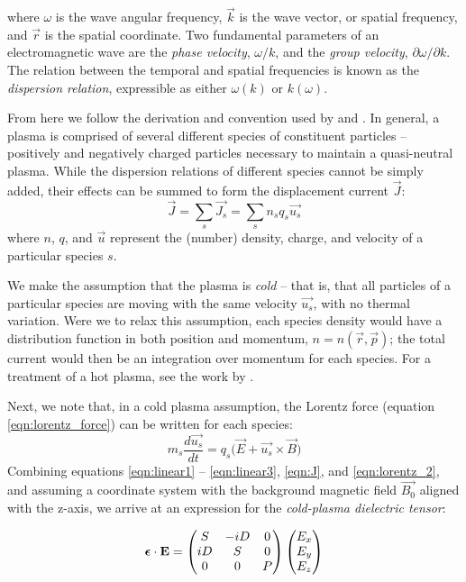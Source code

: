 where $\omega$ is the wave angular frequency, $\vec{k}$ is the wave vector, or spatial frequency, and $\vec{r}$ is the spatial coordinate. Two fundamental parameters of an electromagnetic wave are the \emph{phase velocity}, $\omega/k$, and the \emph{group velocity}, $\partial\omega/\partial k$. The relation between the temporal and spatial frequencies is known as the \emph{dispersion relation}, expressible as either $\omega(k)$ or $k(\omega)$. 

From here we follow the derivation and convention used by \cite{Stix1992} and \cite{Bittencourt2004}. In general, a plasma is comprised of several different species of constituent particles -- positively and negatively charged particles necessary to maintain a quasi-neutral plasma. While the dispersion relations of different species cannot be simply added, their effects can be summed to form the displacement current $\vec{J}$:
\begin{equation}
\vec{J} = \sum_s\vec{J_s} = \sum_s n_s q_s \vec{u_s}
\label{eqn:J}
\end{equation}
where $n$, $q$, and $\vec{u}$ represent the (number) density, charge, and velocity of a particular species $s$. 

We make the assumption that the plasma is \emph{cold} -- that is, that all particles of a particular species are moving with the same velocity $\vec{u_s}$, with no thermal variation.  Were we to relax this assumption, each species density would have a distribution function in both position and momentum, $n=n(\vec{r},\vec{p})$; the total current would then be an integration over momentum for each species. For a treatment of a hot plasma, see the work by \cite{Sazhin1993}.

Next, we note that, in a cold plasma assumption, the Lorentz force (equation \ref{eqn:lorentz_force}) can be written for each species:
\begin{equation}
m_s\frac{d\vec{u_s}}{dt} = q_s\big(\vec{E} + \vec{u_s}\times\vec{B}\big) 
\label{eqn:lorentz_2}
\end{equation}
Combining equations \ref{eqn:linear1} -- \ref{eqn:linear3}, \ref{eqn:J}, and \ref{eqn:lorentz_2}, and assuming a coordinate system with the background magnetic field $\vec{B_0}$ aligned with the z-axis, we arrive at an expression for the \emph{cold-plasma dielectric tensor}:

\begin{equation}
\boldsymbol{\epsilon}\cdot\mathbf{E}=\begin{pmatrix}
S & -iD & 0 \\
iD & S & 0 \\
0 & 0 & P \end{pmatrix}\begin{pmatrix}E_x \\ E_y \\ E_z\end{pmatrix}
\end{equation}

